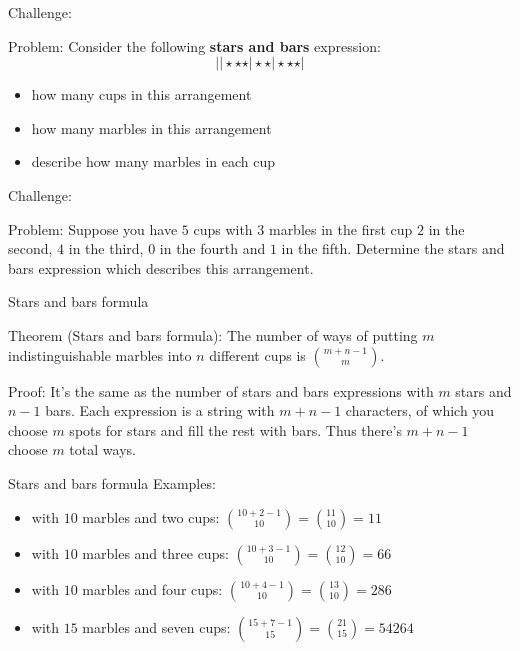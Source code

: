 \documentclass{beamer}
\begin{document}
\begin{frame}{Challenge:}
  \begin{block}{Problem:}
    Consider the following \textbf{stars and bars} expression:
    $$\vert\vert\star\star\star\vert\star\star\vert\star\star\star\vert$$
    \begin{itemize}
\pause
      \item  how many cups in this arrangement
\pause
      \item  how many marbles in this arrangement
\pause
      \item  describe how many marbles in each cup
    \end{itemize}
  \end{block}
\end{frame}

\begin{frame}{Challenge:}
  \begin{block}{Problem:}
    Suppose you have $5$ cups with $3$ marbles in the first cup $2$ in the second, $4$ in the third, $0$ in the fourth and $1$ in the fifth.
    Determine the stars and bars expression which describes this arrangement.
  \end{block}
\end{frame}

\begin{frame}{Stars and bars formula}
  \begin{block}{Theorem (Stars and bars formula):}
    The number of ways of putting $m$ indistinguishable marbles into $n$ different cups is $\binom{m+n-1}{m}$.
  \end{block}
\pause
  \begin{block}{Proof:}
    It's the same as the number of stars and bars expressions with $m$ stars and $n-1$ bars.  Each expression is a string with $m+n-1$ characters, of which you choose $m$ spots for stars and fill the rest with bars.  Thus there's $m+n-1$ choose $m$ total ways.
  \end{block}
\end{frame}

\begin{frame}{Stars and bars formula}
  Examples:
  \begin{itemize}
\pause
    \item with $10$ marbles and two cups: $\binom{10+2-1}{10} = \binom{11}{10} = 11$
\pause
    \item with $10$ marbles and three cups: $\binom{10+3-1}{10} = \binom{12}{10} = 66$
\pause
    \item with $10$ marbles and four cups: $\binom{10+4-1}{10} = \binom{13}{10} = 286$
\pause
    \item with $15$ marbles and seven cups: $\binom{15+7-1}{15} = \binom{21}{15} = 54264$
  \end{itemize}
\end{frame}
\end{document}
